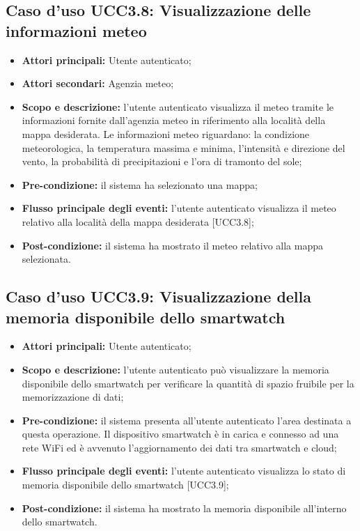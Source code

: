\subsection{Caso d'uso UCC3.8: Visualizzazione delle informazioni meteo}

\begin{itemize}
\item \textbf{Attori principali:} Utente autenticato;
\item \textbf{Attori secondari:} Agenzia meteo;
\item \textbf{Scopo e descrizione:} l'utente autenticato visualizza il meteo tramite le informazioni fornite dall'agenzia meteo in riferimento alla località della mappa desiderata. Le informazioni meteo riguardano: la condizione meteorologica, la temperatura massima e minima, l'intensità e direzione del vento, la probabilità di precipitazioni e l'ora di tramonto del sole;
\item \textbf{Pre-condizione:} il sistema ha selezionato una mappa;
\item \textbf{Flusso principale degli eventi:} l'utente autenticato visualizza il meteo relativo alla località della mappa desiderata [UCC3.8];
\item \textbf{Post-condizione:} il sistema ha mostrato il meteo relativo alla mappa selezionata. 
\end{itemize}

\subsection{Caso d'uso UCC3.9: Visualizzazione della memoria disponibile dello smartwatch}
\begin{itemize}
\item \textbf{Attori principali:} Utente autenticato;
\item \textbf{Scopo e descrizione:} l'utente autenticato può visualizzare la memoria disponibile dello smartwatch per verificare la quantità di spazio fruibile per la memorizzazione di dati;
\item \textbf{Pre-condizione:} il sistema presenta all'utente autenticato l'area destinata a questa operazione. Il dispositivo smartwatch è in carica e connesso ad una rete WiFi ed è avvenuto l'aggiornamento dei dati tra smartwatch e cloud;
\item \textbf{Flusso principale degli eventi:} l'utente autenticato visualizza lo stato di memoria disponibile dello smartwatch [UCC3.9];
\item \textbf{Post-condizione:} il sistema ha mostrato la memoria disponibile all'interno dello smartwatch. 
\end{itemize}

